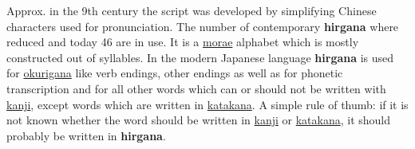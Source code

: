 

Approx. in the 9th century the \lhiragana{} script was developed by simplifying
Chinese characters used for pronunciation. The number of contemporary
\textbf{hirgana} where reduced and today 46 are in use. It is a
\hyperref[sec:Mora]{morae} alphabet which is mostly constructed out of
syllables. In the modern Japanese language \textbf{hirgana} is used for
\hyperref[sec:Okurigana]{okurigana} like verb endings, other endings as well as
for phonetic transcription and for all other words which can or should not be
written with \hyperref[sec:Kanji]{kanji}, except words which are written in
\hyperref[sec:Katakana]{katakana}. A simple rule of thumb: if it is not known
whether the word should be written in \hyperref[sec:Kanji]{kanji} or
\hyperref[sec:Katakana]{katakana}, it should probably be written in
\textbf{hirgana}.
